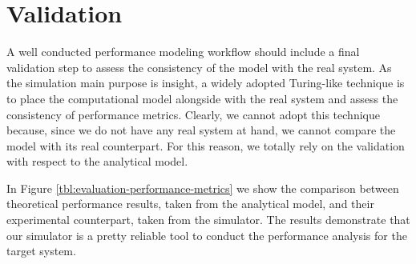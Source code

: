 \section{Validation}
\label{sec:performance-modeling-validation}
A well conducted performance modeling workflow should include a final validation step to assess the consistency of the model with the real system. 
%
As the simulation main purpose is insight, a widely adopted Turing-like technique is to place the computational model alongside with the real system and assess the consistency of performance metrics.
%
Clearly, we cannot adopt this technique because, since we do not have any real system at hand, we cannot compare the model with its real counterpart.
%
For this reason, we totally rely on the validation with respect to the analytical model.

In Figure \ref{tbl:evaluation-performance-metrics} we show the comparison between theoretical performance results, taken from the analytical model, and their experimental counterpart, taken from the simulator.
%
The results demonstrate that our simulator is a pretty reliable tool to conduct the performance analysis for the target system.
